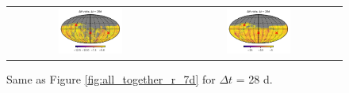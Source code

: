 \documentclass[preprintm,linenumbers]{aastex631}
\begin{document}
\begin{figure}
\begin{tabular}{c c}
         \includegraphics[width=0.4\textwidth]{results/skymaps_cutout/skymaps_cutout_delta_first_year_one_snap_v4_0_10yrs_db_noDD_noTwi_tscale-28_nside-256_doAllTemplateMetrics_reduceCount_g_noDD_noTwi.pdf} &
         \includegraphics[width=0.4\textwidth]{results/skymaps_cutout/skymaps_cutout_delta_first_year_one_snap_v4_0_10yrs_db_noDD_noTwi_tscale-28_nside-256_doAllTemplateMetrics_reduceCount_r_noDD_noTwi.pdf} \\

   \end{tabular}

        \caption{
        Same as Figure \ref{fig:all_together_r_7d} for $\Delta t$ = 28 d. 
        }
        \label{fig:all_together_r_28d}
	\end{figure}

  
\end{document}
